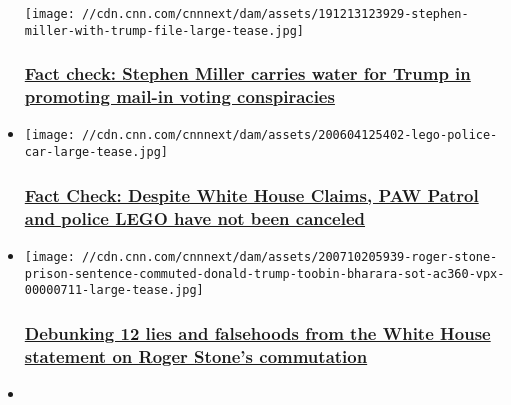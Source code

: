 \begin{itemize}
  \texttt{[image: //cdn.cnn.com/cnnnext/dam/assets/191213123929-stephen-miller-with-trump-file-large-tease.jpg]}

  \hypertarget{fact-check-stephen-miller-carries-water-for-trump-in-promoting-mail-in-voting-conspiracies}{%
  \subsubsection{\texorpdfstring{\href{/2020/07/31/politics/mail-voting-verification-stephen-miller-fact-check/index.html}{Fact
  check: Stephen Miller carries water for Trump in promoting mail-in
  voting
  conspiracies}}{Fact check: Stephen Miller carries water for Trump in promoting mail-in voting conspiracies}}\label{fact-check-stephen-miller-carries-water-for-trump-in-promoting-mail-in-voting-conspiracies}}
\item
  \href{/2020/07/24/politics/paw-patrol-lego-cancel-fact-check/index.html}{}

  \texttt{[image: //cdn.cnn.com/cnnnext/dam/assets/200604125402-lego-police-car-large-tease.jpg]}

  \hypertarget{fact-check-despite-white-house-claims-paw-patrol-and-police-lego-have-not-been-canceled}{%
  \subsubsection{\texorpdfstring{\href{/2020/07/24/politics/paw-patrol-lego-cancel-fact-check/index.html}{Fact
  Check: Despite White House Claims, PAW Patrol and police LEGO have not
  been
  canceled}}{Fact Check: Despite White House Claims, PAW Patrol and police LEGO have not been canceled}}\label{fact-check-despite-white-house-claims-paw-patrol-and-police-lego-have-not-been-canceled}}
\item
  \href{/2020/07/10/politics/fact-check-white-house-statement-roger-stone-commutation/index.html}{}

  \texttt{[image: //cdn.cnn.com/cnnnext/dam/assets/200710205939-roger-stone-prison-sentence-commuted-donald-trump-toobin-bharara-sot-ac360-vpx-00000711-large-tease.jpg]}

  \hypertarget{debunking-12-lies-and-falsehoods-from-the-white-house-statement-on-roger-stones-commutation-}{%
  \subsubsection{\texorpdfstring{\href{/2020/07/10/politics/fact-check-white-house-statement-roger-stone-commutation/index.html}{Debunking
  12 lies and falsehoods from the White House statement on Roger Stone's
  commutation
  }}{Debunking 12 lies and falsehoods from the White House statement on Roger Stone's commutation }}\label{debunking-12-lies-and-falsehoods-from-the-white-house-statement-on-roger-stones-commutation-}}
\item
  \href{/2020/07/08/politics/donald-trump-threat-to-cut-school-funding-fact-check/index.html}{}


\end{itemize}
